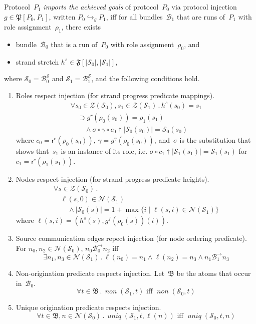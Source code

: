 \documentclass[12pt]{article}
\newcommand{\fn}[1]{\ensuremath{\operatorname{\mathit{#1}}}}
\newcommand{\prefix}[2]{#1\dagger#2}
\newcommand{\all}[1]{\forall#1\mathpunct.}
\newcommand{\some}[1]{\exists#1\mathpunct.}
\newcommand{\alg}[1]{\ensuremath{\mathfrak{#1}}}
\newcommand{\atm}{\alg{B}}
\newcommand{\ssp}{\ensuremath{\mathcal{S}}}
\newcommand{\bun}{\ensuremath{\mathcal{B}}}
\newcommand{\strands}{\ensuremath{\mathcal{Z}}}
\newcommand{\nodes}{\ensuremath{\mathcal{N}}}
\newcommand{\rl}{\ensuremath{\rho}}
\newcommand{\role}{\mathsf{r}}
\begin{document}
Protocol~$P_1$ \emph{imports the achieved goals} of protocol~$P_0$ via
protocol injection $g\in\alg{P}[P_0,P_1]$, written
$P_0\hookrightarrow_g P_1$, iff for all bundles~$\bun_1$ that are runs
of~$P_1$ with role assignment~$\rl_1$, there exists
\begin{itemize}
\item bundle~$\bun_0$ that is a run of~$P_0$ with role
  assignment~$\rl_0$, and
\item strand stretch $h^s\in\alg{F}[|\ssp_0|, |\ssp_1|]$,
\end{itemize}
where $\ssp_0=\bun^\ssp_0$ and $\ssp_1=\bun^\ssp_1$, and the following
conditions hold.
\begin{enumerate}

\item\label{item: role mappings} Roles respect injection (for strand
  progress predicate mappings).
  \[\begin{array}{l}
  \all{s_0\in\strands(\ssp_0),s_1\in\strands(\ssp_1)}h^s(s_0) =
  s_1\\ \quad\supset
  g^r(\rl_0(s_0))=\rl_1(s_1)\\ \qquad{}\land\sigma\circ
  \gamma\circ\prefix{c_0}{|\ssp_0(s_0)|}
  = \ssp_0(s_0)
  \end{array}\]
  where $c_0=\role^c(\rl_0(s_0))$,
  $\gamma=g^\gamma(\rl_0(s_0))$, and~$\sigma$ is the substitution that
  shows that~$s_1$ is an instance of its role, i.e.\@
  $\sigma\circ\prefix{c_1}{|\ssp_1(s_1)|}=\ssp_1(s_1)$ for
  $c_1=\role^c(\rl_1(s_1))$.

\item\label{item: role heights} Nodes respect injection (for strand
  progress predicate heights).
  \[\begin{array}{l}
  \all{s\in\strands(\ssp_0)}\\
  \quad\ell(s,0)\in\nodes(\ssp_1)\\
  \qquad{}\land|\ssp_0(s)|=1+\max
  \{i\mid\ell(s,i)\in\nodes(\ssp_1)\}
  \end{array}\]
  where $\ell(s,i)=(h^s(s),g^f(\rl_0(s))(i))$.

\item\label{item: node orderings} Source communication edges repect
  injection (for node ordering predicate).  For
  $n_0,n_2\in\nodes(\ssp_0)$, $n_0\mathbin{\bun^\to_0} n_2$ iff
  \[\some{n_1,n_3\in\nodes(\ssp_1)}\ell(n_0)=n_1\land\ell(n_2)=n_3\land
  n_1\mathbin{\bun^\to_1} n_3\]

\item\label{item: nons} Non-origination predicate respects injection.
  Let~$\atm$ be the atoms that occur in~$\bun_0$.
  \[\all{t\in\atm}\fn{non}(\ssp_1, t)\mbox{ iff }\fn{non}(\ssp_0, t)\]

\item\label{item: uniqs} Unique origination predicate respects
  injection.
  \[\all{t\in\atm,n\in\nodes(\ssp_0)}\fn{uniq}(\ssp_1,
  t,\ell(n))\mbox{ iff }\fn{uniq}(\ssp_0, t,n)\]
\end{enumerate}
\end{document}
